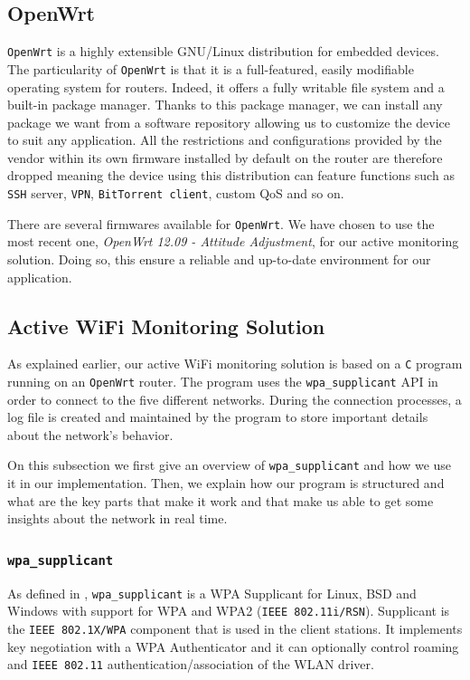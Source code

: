 \subsection{OpenWrt}
\texttt{OpenWrt} \cite{openwrt} is a highly extensible GNU/Linux distribution for embedded devices. The particularity of \texttt{OpenWrt} is that it is a full-featured, easily modifiable operating system for routers. Indeed, it offers a fully writable file system and a built-in package manager. Thanks to this package manager, we can install any package we want from a software repository allowing us to customize the device to suit any application. All the restrictions and configurations provided by the vendor within its own firmware installed by default on the router are therefore dropped meaning the device using this distribution can feature functions such as \texttt{SSH} server, \texttt{VPN}, \texttt{BitTorrent client}, custom QoS and so on.

There are several firmwares available for \texttt{OpenWrt}. We have chosen to use the most recent one, \textit{OpenWrt 12.09 - Attitude Adjustment}, for our active monitoring solution. Doing so, this ensure a reliable and up-to-date environment for our application.


\subsection{Active WiFi Monitoring Solution}
As explained earlier, our active WiFi monitoring solution is based on a \texttt{C} program running on an \texttt{OpenWrt} router. The program uses the \texttt{wpa\_supplicant} API in order to connect to the five different networks. During the connection processes, a log file is created and maintained by the program to store important details about the network's behavior. 

On this subsection we first give an overview of \texttt{wpa\_supplicant} and how we use it in our implementation. Then, we explain how our program is structured and what are the key parts that make it work and that make us able to get some insights about the network in real time.

\subsubsection{\texttt{wpa\_supplicant}} %
 As defined in \cite{wpa-supplicant}, \texttt{wpa\_supplicant} is a WPA Supplicant for Linux, BSD and Windows with support for WPA and WPA2 (\texttt{IEEE 802.11i/RSN}). Supplicant is the \texttt{IEEE 802.1X/WPA} component that is used in the client stations. It implements key negotiation with a WPA Authenticator and it can optionally control roaming and \texttt{IEEE 802.11} authentication/association of the WLAN driver.

